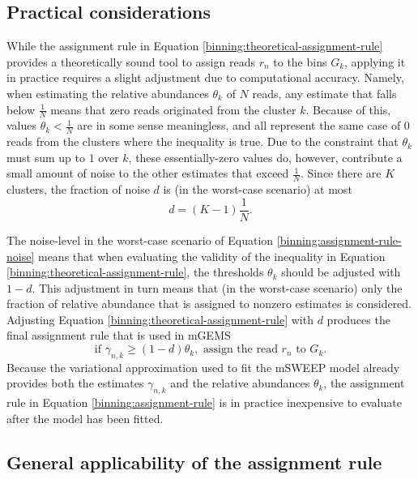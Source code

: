 \documentclass[officiallayout]{tktla}
\begin{document}
\subsection{Practical considerations}

While the assignment rule in Equation
\eqref{binning:theoretical-assignment-rule} provides a theoretically
sound tool to assign reads $r_{n}$ to the bins $G_{k}$, applying it in
practice requires a slight adjustment due to computational
accuracy. Namely, when estimating the relative abundances $\theta_{k}$
of $N$ reads, any estimate that falls below $\frac{1}{N}$ means that
zero reads originated from the cluster $k$. Because of this, values
$\theta_{k} < \frac{1}{N}$ are in some sense meaningless, and all
represent the same case of 0 reads from the clusters where the
inequality is true. Due to the constraint that $\theta_{k}$ must sum
up to $1$ over $k$, these essentially-zero values do, however,
contribute a small amount of noise to the other estimates that exceed
$\frac{1}{N}$. Since there are $K$ clusters, the fraction of noise $d$
is (in the worst-case scenario) at most
\begin{equation}
  \label{binning:assignment-rule-noise}
  d = (K - 1)\frac{1}{N}.
\end{equation}

The noise-level in the worst-case scenario of Equation
\eqref{binning:assignment-rule-noise} means that when evaluating the
validity of the inequality in Equation
\eqref{binning:theoretical-assignment-rule}, the thresholds $\theta_k$
should be adjusted with $1 - d$. This adjustment in turn means that
(in the worst-case scenario) only the fraction of relative abundance
that is assigned to nonzero estimates is considered. Adjusting
Equation \eqref{binning:theoretical-assignment-rule} with $d$ produces
the final assignment rule that is used in mGEMS
\begin{equation}
  \label{binning:assignment-rule}
  \text{if } \gamma_{n, k} \geq (1 - d)\theta_{k}, \text{ assign the read } r_{n} \text{ to } G_{k}.
\end{equation}
Because the variational approximation used to fit the mSWEEP model
already provides both the estimates $\gamma_{n, k}$ and the relative
abundances $\theta_{k}$, the assignment rule in Equation
\eqref{binning:assignment-rule} is in practice inexpensive to
evaluate after the model has been fitted.

\subsection{General applicability of the assignment rule}
\end{document}
